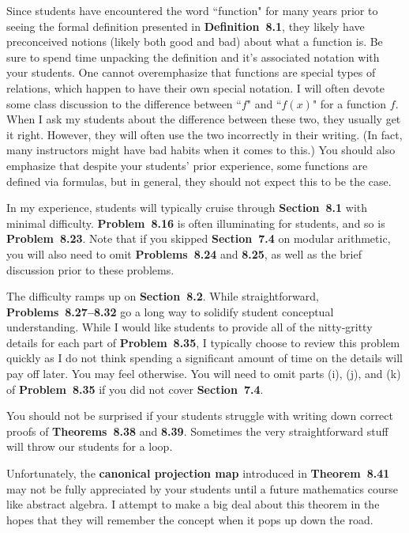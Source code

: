 \documentclass[11pt]{article}%
\newcommand{\blankline}{\pagebreak[2]\vspace{.5\baselineskip}}
\begin{document}
Since students have encountered the word ``function" for many years prior to seeing the formal definition presented in \textbf{Definition~8.1}, they likely have preconceived notions (likely both good and bad) about what a function is.  Be sure to spend time unpacking the definition and it's associated notation with your students. One cannot overemphasize that functions are special types of relations, which happen to have their own special notation.  I will often devote some class discussion to the difference between ``$f$" and ``$f(x)$" for a function $f$. When I ask my students about the difference between these two, they usually get it right.  However, they will often use the two incorrectly in their writing. (In fact, many instructors might have bad habits when it comes to this.) You should also emphasize that despite your students' prior experience, some functions are defined via formulas, but in general, they should not expect this to be the case. 

\blankline

In my experience, students will typically cruise through \textbf{Section~8.1} with minimal difficulty.  \textbf{Problem~8.16} is often illuminating for students, and so is \textbf{Problem~8.23}.  Note that if you skipped \textbf{Section~7.4} on modular arithmetic, you will also need to omit \textbf{Problems~8.24} and \textbf{8.25}, as well as the brief discussion prior to these problems.

\blankline

The difficulty ramps up on \textbf{Section~8.2}. While straightforward, \textbf{Problems~8.27--8.32} go a long way to solidify student conceptual understanding.  While I would like students to provide all of the nitty-gritty details for each part of \textbf{Problem~8.35}, I typically choose to review this problem quickly as I do not think spending a significant amount of time on the details will pay off later.  You may feel otherwise.  You will need to omit parts (i), (j), and (k) of \textbf{Problem~8.35} if you did not cover \textbf{Section~7.4}.  

\blankline

You should not be surprised if your students struggle with writing down correct proofs of \textbf{Theorems~8.38} and \textbf{8.39}.  Sometimes the very straightforward stuff will throw our students for a loop.  

\blankline

Unfortunately, the \textbf{canonical projection map} introduced in \textbf{Theorem~8.41} may not be fully appreciated by your students until a future mathematics course like abstract algebra. I attempt to make a big deal about this theorem in the hopes that they will remember the concept when it pops up down the road.
\end{document}
